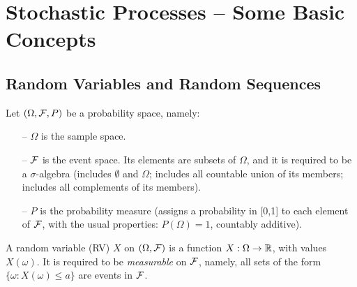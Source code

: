 %
%
%
%
%
%
%
%
%

\newcommand{\midarrow}{\to}
\newcommand{\uu}{\underline}
\newcommand{\oo}{\overline}
\newcommand{\limn}{\lim_{n \to \infty}}
\newcommand{\limsupn}{\limsup_{n \to \infty}}

\section{Stochastic Processes -- Some Basic Concepts}

\subsection{Random Variables and Random Sequences}

Let $(\Omega,\mathcal F,P)$ be a probability space, namely:
\begin{itemize}
\item[--] $\Omega$ is the sample space.
\item[--] $\mathcal F$ is the event space. Its elements are subsets
of $\Omega$, and it is required to be a $\sigma$-algebra
(includes $\emptyset$ and $\Omega$; includes all countable union of its members;
includes all complements of its members).
\item[--]$P$ is the probability measure (assigns a probability in [0,1] to each element
of $\mathcal F$, with the usual properties: $P(\Omega)=1$, countably additive).
\end{itemize}

A random variable (RV) $X$ on $(\Omega,\mathcal F)$
is a function $X:\Omega \to \mathbb{R}$, with values $X(\omega)$.
It is required to be {\em measurable} on $\mathcal F$,
namely, all sets of the form $\{\omega: X(\omega)\le a\}$ are
events in $\mathcal F$.

